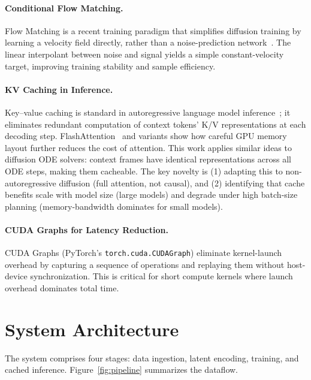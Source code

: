 \documentclass[letterpaper,twocolumn,10pt]{article}
\begin{document}
\paragraph{Conditional Flow Matching.}
Flow Matching is a recent training paradigm that simplifies diffusion training by learning a velocity field directly, rather than a noise-prediction network~\cite{lipman2023flow}.  The linear interpolant between noise and signal yields a simple constant-velocity target, improving training stability and sample efficiency.

\paragraph{KV Caching in Inference.}
Key--value caching is standard in autoregressive language model inference~\cite{openai2019gpt3}; it eliminates redundant computation of context tokens' K/V representations at each decoding step. FlashAttention~\cite{dao2022flashattention} and variants show how careful GPU memory layout further reduces the cost of attention.  This work applies similar ideas to diffusion ODE solvers: context frames have identical representations across all ODE steps, making them cacheable.
The key novelty is (1) adapting this to non-autoregressive diffusion (full attention, not causal), and (2) identifying that cache benefits scale with model size (large models) and degrade under high batch-size planning (memory-bandwidth dominates for small models).

\paragraph{CUDA Graphs for Latency Reduction.}
CUDA Graphs (PyTorch's \texttt{torch.cuda.CUDAGraph}) eliminate kernel-launch overhead by capturing a sequence of operations and replaying them without host-device synchronization.  This is critical for short compute kernels where launch overhead dominates total time.

\section{System Architecture}

The system comprises four stages: data ingestion, latent encoding, training, and cached inference.  Figure~\ref{fig:pipeline} summarizes
the dataflow.
\end{document}
